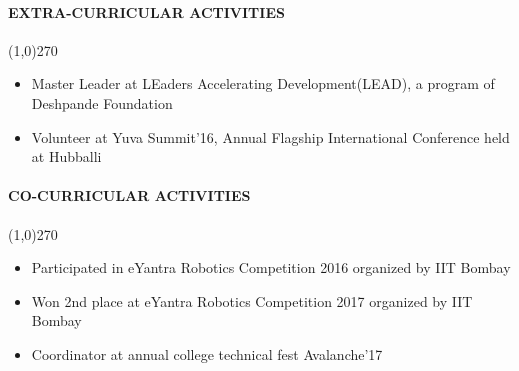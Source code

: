 \documentclass[12pt,a4paper]{article}
\begin{document}
\paragraph{EXTRA-CURRICULAR ACTIVITIES}
	\line(1,0){270}
	\begin{itemize}
		\item Master Leader at LEaders Accelerating Development(LEAD), a program of Deshpande Foundation
		\item Volunteer at Yuva Summit'16, Annual Flagship International Conference held at Hubballi
	\end{itemize}
\paragraph{CO-CURRICULAR ACTIVITIES}
	\line(1,0){270}
	\begin{itemize}
		\item Participated in eYantra Robotics Competition 2016 organized by IIT Bombay
		\item Won 2nd place at eYantra Robotics Competition 2017 organized by IIT Bombay
		\item Coordinator at annual college technical fest Avalanche'17
	\end{itemize}
\end{document}
